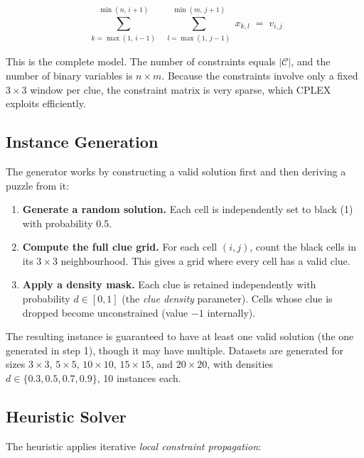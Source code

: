 \begin{equation}
  \sum_{\substack{k = \max(1,\,i-1)}}^{\min(n,\,i+1)}\;
  \sum_{\substack{l = \max(1,\,j-1)}}^{\min(m,\,j+1)}
  x_{k,l}
  \;=\; v_{i,j}
  \label{eq:mosaic_clue}
\end{equation}

This is the complete model. The number of constraints equals $|\mathcal{C}|$, and the number of binary variables is $n \times m$. Because the constraints involve only a fixed $3 \times 3$ window per clue, the constraint matrix is very sparse, which CPLEX exploits efficiently.

\subsection{Instance Generation}

The generator works by constructing a valid solution first and then deriving a puzzle from it:

\begin{enumerate}
  \item \textbf{Generate a random solution.} Each cell is independently set to black (1) with probability 0.5.
  \item \textbf{Compute the full clue grid.} For each cell $(i,j)$, count the black cells in its $3 \times 3$ neighbourhood. This gives a grid where every cell has a valid clue.
  \item \textbf{Apply a density mask.} Each clue is retained independently with probability $d \in [0,1]$ (the \emph{clue density} parameter). Cells whose clue is dropped become unconstrained (value $-1$ internally).
\end{enumerate}

The resulting instance is guaranteed to have at least one valid solution (the one generated in step 1), though it may have multiple. Datasets are generated for sizes $3 \times 3$, $5 \times 5$, $10 \times 10$, $15 \times 15$, and $20 \times 20$, with densities $d \in \{0.3, 0.5, 0.7, 0.9\}$, 10 instances each.

\subsection{Heuristic Solver}

The heuristic applies iterative \emph{local constraint propagation}:

